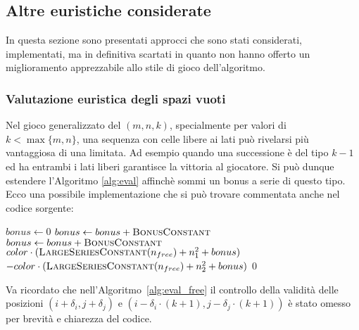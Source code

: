 \documentclass{article}
\begin{document}
\subsection{Altre euristiche considerate}

In questa sezione sono presentati approcci che sono stati considerati,
implementati, ma in definitiva scartati in quanto non hanno offerto un
miglioramento apprezzabile allo stile di gioco dell'algoritmo.

\subsubsection{Valutazione euristica degli spazi vuoti}

Nel gioco generalizzato del $(m, n, k)$, specialmente per valori di $k < \max\{m,n\}$,
una sequenza con celle libere ai lati pu\`o rivelarsi pi\`u vantaggiosa di una
limitata. Ad esempio quando una successione \`e del tipo $k-1$ ed ha entrambi i lati liberi
garantisce la vittoria al giocatore. Si pu\`o dunque estendere l'Algoritmo
\vref{alg:eval} affinch\`e sommi un bonus a serie di questo tipo.
Ecco una possibile implementazione che si pu\`o trovare
commentata anche nel codice sorgente:

\begin{algorithm}[H]
  \caption{Valutazione delle serie favorendo spazi liberi adiacenti}
  \label{alg:eval_free}
  \begin{algorithmic}[0]
    \State $bonus \gets 0$
      \State $bonus \gets bonus + \textsc{BonusConstant}$
    \EndIf
      \State $bonus \gets bonus + \textsc{BonusConstant}$
    \EndIf
    \Statex
      \State \Return $color \cdot (\Call{LargeSeriesConstant}{n_{free}} + n_1^2 + bonus)$
    \State \Return $-color \cdot (\Call{LargeSeriesConstant}{n_{free}} + n_2^2 + bonus)$
    \Else
      \State \Return $0$
    \EndIf
    \EndProcedure
  \end{algorithmic}
\end{algorithm}

Va ricordato che nell'Algoritmo~\ref{alg:eval_free} il controllo della validit\`a delle
posizioni $(i + \delta_i, j + \delta_j)$ e $(i - \delta_i \cdot (k+1), j - \delta_j \cdot (k+1))$
\`e stato omesso per brevit\`a e chiarezza del codice.
\end{document}
